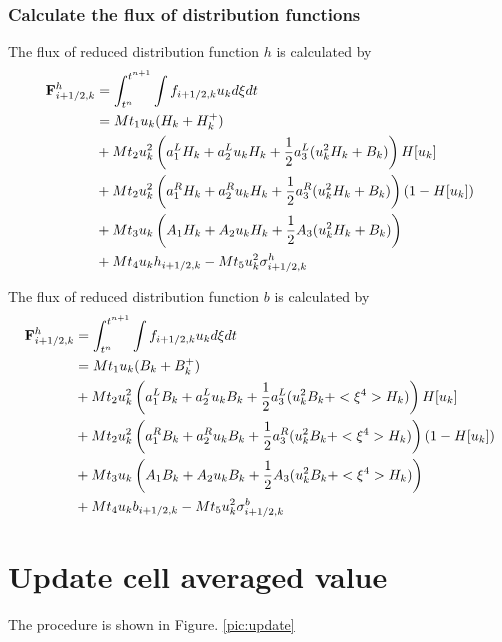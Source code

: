 \documentclass[a4paper]{book}
\begin{document}
\subsubsection*{Calculate the flux of distribution functions}
The flux of reduced distribution function $h$ is calculated by
$$
\begin{aligned}
    {\bf F}_{i+1/2,k}^h &= \int_{t^n}^{t^{n+1}}\int f_{i+1/2,k}u_k d\xi dt\\
                        &= Mt_1 u_k (H_k+H_k^+)\\
                        &+ Mt_2 u_k^2 \left(a_1^L H_k + a_2^L u_k H_k + \frac{1}{2}a_3^L(u_k^2 H_k+B_k)\right)H[u_k]\\
                        &+ Mt_2 u_k^2 \left(a_1^R H_k + a_2^R u_k H_k + \frac{1}{2}a_3^R(u_k^2 H_k+B_k)\right)(1-H[u_k])\\
                        &+ Mt_3 u_k \left(A_1 H_k + A_2 u_k H_k + \frac{1}{2}A_3(u_k^2 H_k+B_k)\right)\\
                        &+ Mt_4 u_k h_{i+1/2,k}-Mt_5 u_k^2 \sigma_{i+1/2,k}^h
\end{aligned} 
$$

The flux of reduced distribution function $b$ is calculated by
$$
\begin{aligned}
    {\bf F}_{i+1/2,k}^h &= \int_{t^n}^{t^{n+1}}\int f_{i+1/2,k}u_k d\xi dt\\
                        &= Mt_1 u_k (B_k+B_k^+)\\
                        &+ Mt_2 u_k^2 \left(a_1^L B_k + a_2^L u_k B_k + \frac{1}{2}a_3^L(u_k^2 B_k+<\xi^4>H_k)\right)H[u_k]\\
                        &+ Mt_2 u_k^2 \left(a_1^R B_k + a_2^R u_k B_k + \frac{1}{2}a_3^R(u_k^2 B_k+<\xi^4>H_k)\right)(1-H[u_k])\\
                        &+ Mt_3 u_k \left(A_1 B_k + A_2 u_k B_k + \frac{1}{2}A_3(u_k^2 B_k+<\xi^4>H_k)\right)\\
                        &+ Mt_4 u_k b_{i+1/2,k}-Mt_5 u_k^2 \sigma_{i+1/2,k}^b
\end{aligned} 
$$

\section{Update cell averaged value}
The procedure is shown in Figure. \ref{pic:update}
\end{document}
